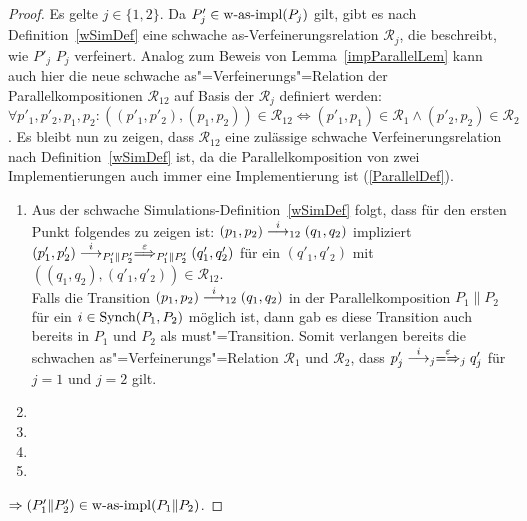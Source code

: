 \begin{proof}\mbox{}
  Es gelte $j\in\{1,2\}$. Da $P'_j\in\mathrm{w}\text{-}\mathrm{as}\text{-}\mathrm{impl} (P_j)$ gilt, gibt es nach
  Definition~\ref{wSimDef} eine schwache as-Verfeinerungsrelation
  $\mathcal{R}_j$, die beschreibt, wie $P'_j$ $P_j$ verfeinert. Analog zum
  Beweis von Lemma~\ref{impParallelLem} kann auch hier die neue schwache
  as"=Verfeinerungs"=Relation der Parallelkompositionen $\mathcal{R}_{12}$
  auf Basis der $\mathcal{R}_j$ definiert werden: $\forall p'_1,p'_2,p_1,p_2:
  ((p'_1,p'_2),(p_1,p_2))\in\mathcal{R}_{12} \Leftrightarrow
  (p'_1,p_1)\in\mathcal{R}_1 \land (p'_2,p_2)\in\mathcal{R}_2$. Es bleibt nun
  zu zeigen, dass $\mathcal{R}_{12}$ eine zulässige schwache
  Verfeinerungsrelation nach Definition~\ref{wSimDef} ist, da die
  Parallelkomposition von zwei Implementierungen auch immer eine
  Implementierung ist (\ref{ParallelDef}).
  \begin{enumerate}
    \item Aus der schwache Simulations-Definition~\ref{wSimDef} folgt, dass für
      den ersten Punkt folgendes zu zeigen ist:
      $(p_1,p_2)\must[i]_{12}(q_1,q_2)$ impliziert $(p'_1,p'_2)
      \must[i]_{P'_1\|P'_2} \weakmust[\varepsilon]_{P'_1\|P'_2} (q'_1,q'_2)$
      für ein $(q'_1,q'_2)$ mit $((q_1,q_2),(q'_1,q'_2))\in\mathcal{R}_{12}$.\\
      Falls die Transition $(p_1,p_2)\must[i]_{12}(q_1,q_2)$ in der
      Parallelkomposition $P_1\|P_2$ für ein $i\in\mathrm{Synch}(P_1,P_2)$ möglich ist,
      dann gab es diese Transition auch bereits in $P_1$ und $P_2$ als
      must"=Transition. Somit verlangen bereits die schwachen
      as"=Verfeinerungs"=Relation $\mathcal{R}_1$ und $\mathcal{R}_2$, dass
      $p'_j\must[i]_j\weakmay[\varepsilon]_jq'_j$ für $j=1$ und $j=2$ gilt.
    \item {}
    \item {}
    \item {}
    \item {}
  \end{enumerate}


  $\Rightarrow (P'_1\|P'_2)\in\mathrm{w}\text{-}\mathrm{as}\text{-}\mathrm{impl} (P_1\|P_2)$.
\end{proof}

